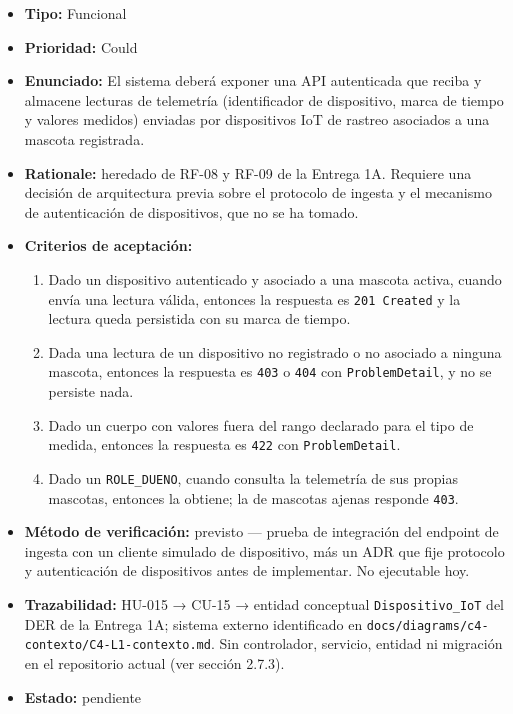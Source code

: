 \documentclass[
  spanish,
]{article}
\providecommand{\tightlist}{%
  \setlength{\itemsep}{0pt}\setlength{\parskip}{0pt}}
\begin{document}
\begin{itemize}
\tightlist
\item
  \textbf{Tipo:} Funcional
\item
  \textbf{Prioridad:} Could
\item
  \textbf{Enunciado:} El sistema deberá exponer una API autenticada que
  reciba y almacene lecturas de telemetría (identificador de
  dispositivo, marca de tiempo y valores medidos) enviadas por
  dispositivos IoT de rastreo asociados a una mascota registrada.
\item
  \textbf{Rationale:} heredado de RF-08 y RF-09 de la Entrega 1A.
  Requiere una decisión de arquitectura previa sobre el protocolo de
  ingesta y el mecanismo de autenticación de dispositivos, que no se ha
  tomado.
\item
  \textbf{Criterios de aceptación:}

  \begin{enumerate}
  \def\labelenumi{\arabic{enumi}.}
  \tightlist
  \item
    Dado un dispositivo autenticado y asociado a una mascota activa,
    cuando envía una lectura válida, entonces la respuesta es
    \texttt{201\ Created} y la lectura queda persistida con su marca de
    tiempo.
  \item
    Dada una lectura de un dispositivo no registrado o no asociado a
    ninguna mascota, entonces la respuesta es \texttt{403} o
    \texttt{404} con \texttt{Problem\allowbreak{}Detail}, y no se persiste nada.
  \item
    Dado un cuerpo con valores fuera del rango declarado para el tipo de
    medida, entonces la respuesta es \texttt{422} con
    \texttt{Problem\allowbreak{}Detail}.
  \item
    Dado un \texttt{ROLE\_\allowbreak{}DUENO}, cuando consulta la telemetría de sus
    propias mascotas, entonces la obtiene; la de mascotas ajenas
    responde \texttt{403}.
  \end{enumerate}
\item
  \textbf{Método de verificación:} previsto --- prueba de integración
  del endpoint de ingesta con un cliente simulado de dispositivo, más un
  ADR que fije protocolo y autenticación de dispositivos antes de
  implementar. No ejecutable hoy.
\item
  \textbf{Trazabilidad:} HU-015 → CU-15 → entidad conceptual
  \texttt{Dispositivo\_\allowbreak{}Io\allowbreak{}T} del DER de la Entrega 1A; sistema externo
  identificado en \texttt{docs/\allowbreak{}diagrams/\allowbreak{}c4-\allowbreak{}contexto/\allowbreak{}C4-\allowbreak{}L1-\allowbreak{}contexto.\allowbreak{}md}.
  Sin controlador, servicio, entidad ni migración en el repositorio
  actual (ver sección 2.7.3).
\item
  \textbf{Estado:} pendiente
\end{itemize}
\end{document}
